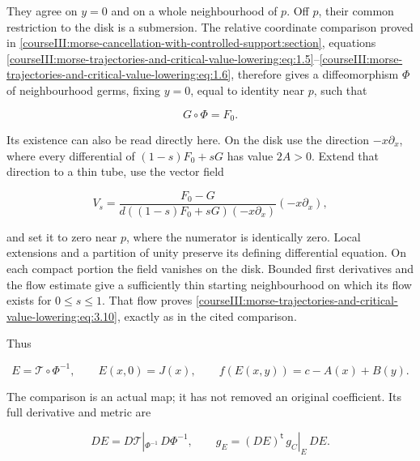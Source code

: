 They agree on \(y=0\) and on a whole neighbourhood of \(p\). Off \(p\), their common restriction to the disk is a submersion. The relative coordinate comparison proved in \cref{courseIII:morse-cancellation-with-controlled-support:section}, equations \eqref{courseIII:morse-trajectories-and-critical-value-lowering:eq:1.5}--\eqref{courseIII:morse-trajectories-and-critical-value-lowering:eq:1.6}, therefore gives a diffeomorphism \(\Phi\) of neighbourhood germs, fixing \(y=0\), equal to identity near \(p\), such that

\begin{equation}
G\circ\Phi=F_0.
 \label{courseIII:morse-trajectories-and-critical-value-lowering:eq:3.10}
\end{equation}

Its existence can also be read directly here. On the disk use the direction \(-x\partial_x\), where every differential of
\((1-s)F_0+sG\) has value \(2A>0\). Extend that direction to a thin tube, use the vector field

\begin{equation}
V_s=\frac{F_0-G}{d((1-s)F_0+sG)(-x\partial_x)}
       (-x\partial_x),
 \label{courseIII:morse-trajectories-and-critical-value-lowering:eq:3.11}
\end{equation}

and set it to zero near \(p\), where the numerator is identically zero. Local extensions and a partition of unity preserve its defining differential equation. On each compact portion the field vanishes on the disk. Bounded first derivatives and the flow estimate give a sufficiently thin starting neighbourhood on which its flow exists for \(0\leq s\leq1\). That flow proves \eqref{courseIII:morse-trajectories-and-critical-value-lowering:eq:3.10}, exactly as in the cited comparison.

Thus

\begin{equation}
E=\mathcal T\circ\Phi^{-1},\qquad
 E(x,0)=J(x),\qquad
 f(E(x,y))=c-A(x)+B(y).
 \label{courseIII:morse-trajectories-and-critical-value-lowering:eq:3.12}
\end{equation}

The comparison is an actual map; it has not removed an original coefficient. Its full derivative and metric are

\begin{equation}
DE=D\mathcal T|_{\Phi^{-1}}\,D\Phi^{-1},
 \qquad
 g_E=(DE)^{\mathsf t}\,g_C|_E\,DE.
 \label{courseIII:morse-trajectories-and-critical-value-lowering:eq:3.13}
\end{equation}

